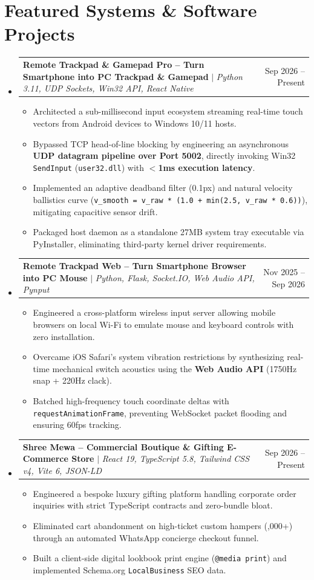 \documentclass[letterpaper,11pt]{article}
\makeatletter
\newcommand{\resumeItem}[1]{
  \item\small{
    {#1 \vspace{-2pt}}
  }
}
\newcommand{\resumeProjectHeading}[2]{
    \item
    \begin{tabular*}{0.97\textwidth}{l@{\extracolsep{\fill}}r}
      \small#1 & #2 \\
    \end{tabular*}\vspace{-7pt}
}
\newcommand{\resumeSubHeadingListStart}{\begin{itemize}[leftmargin=0.15in, label={}]}
\newcommand{\resumeSubHeadingListEnd}{\end{itemize}}
\newcommand{\resumeItemListStart}{\begin{itemize}}
\newcommand{\resumeItemListEnd}{\end{itemize}\vspace{-5pt}}
\makeatother
\begin{document}
\section{Featured Systems \& Software Projects}
    \resumeSubHeadingListStart
      \resumeProjectHeading
          {\textbf{Remote Trackpad \& Gamepad Pro -- Turn Smartphone into PC Trackpad \& Gamepad} $|$ \emph{Python 3.11, UDP Sockets, Win32 API, React Native}}{Sep 2026 -- Present}
          \resumeItemListStart
            \resumeItem{Architected a sub-millisecond input ecosystem streaming real-time touch vectors from Android devices to Windows 10/11 hosts.}
            \resumeItem{Bypassed TCP head-of-line blocking by engineering an asynchronous \textbf{UDP datagram pipeline over Port 5002}, directly invoking Win32 \texttt{SendInput} (\texttt{user32.dll}) with \textbf{$<$1ms execution latency}.}
            \resumeItem{Implemented an adaptive deadband filter (0.1px) and natural velocity ballistics curve (\texttt{v_smooth = v_raw * (1.0 + min(2.5, v_raw * 0.6))}), mitigating capacitive sensor drift.}
            \resumeItem{Packaged host daemon as a standalone 27MB system tray executable via PyInstaller, eliminating third-party kernel driver requirements.}
          \resumeItemListEnd

      \resumeProjectHeading
          {\textbf{Remote Trackpad Web -- Turn Smartphone Browser into PC Mouse} $|$ \emph{Python, Flask, Socket.IO, Web Audio API, Pynput}}{Nov 2025 -- Sep 2026}
          \resumeItemListStart
            \resumeItem{Engineered a cross-platform wireless input server allowing mobile browsers on local Wi-Fi to emulate mouse and keyboard controls with zero installation.}
            \resumeItem{Overcame iOS Safari's system vibration restrictions by synthesizing real-time mechanical switch acoustics using the \textbf{Web Audio API} (1750Hz snap + 220Hz clack).}
            \resumeItem{Batched high-frequency touch coordinate deltas with \texttt{requestAnimationFrame}, preventing WebSocket packet flooding and ensuring 60fps tracking.}
          \resumeItemListEnd

      \resumeProjectHeading
          {\textbf{Shree Mewa -- Commercial Boutique \& Gifting E-Commerce Store} $|$ \emph{React 19, TypeScript 5.8, Tailwind CSS v4, Vite 6, JSON-LD}}{Sep 2026 -- Present}
          \resumeItemListStart
            \resumeItem{Engineered a bespoke luxury gifting platform handling corporate order inquiries with strict TypeScript contracts and zero-bundle bloat.}
            \resumeItem{Eliminated cart abandonment on high-ticket custom hampers (\rupee 25,000+) through an automated WhatsApp concierge checkout funnel.}
            \resumeItem{Built a client-side digital lookbook print engine (\texttt{@media print}) and implemented Schema.org \texttt{LocalBusiness} SEO data.}
          \resumeItemListEnd
    \resumeSubHeadingListEnd
\end{document}
